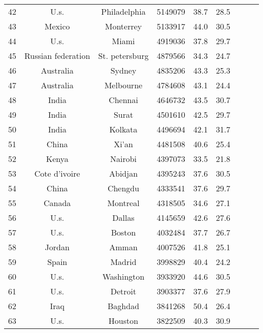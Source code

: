 \begin{table}
\begin{tabular}{ccccccccc}
  42 &                U.s. &    Philadelphia &    5149079 &     38.7 &     28.5 \\
  43 &              Mexico &       Monterrey &    5133917 &     44.0 &     30.5 \\
  44 &                U.s. &           Miami &    4919036 &     37.8 &     29.7 \\
  45 &  Russian federation &  St. petersburg &    4879566 &     34.3 &     24.7 \\
  46 &           Australia &          Sydney &    4835206 &     43.3 &     25.3 \\
  47 &           Australia &       Melbourne &    4784608 &     43.1 &     24.4 \\
  48 &               India &         Chennai &    4646732 &     43.5 &     30.7 \\
  49 &               India &           Surat &    4501610 &     42.5 &     29.7 \\
  50 &               India &         Kolkata &    4496694 &     42.1 &     31.7 \\
  51 &               China &           Xi'an &    4481508 &     40.6 &     25.4 \\
  52 &               Kenya &         Nairobi &    4397073 &     33.5 &     21.8 \\
  53 &       Cote d'ivoire &         Abidjan &    4395243 &     37.6 &     30.5 \\
  54 &               China &         Chengdu &    4333541 &     37.6 &     29.7 \\
  55 &              Canada &        Montreal &    4318505 &     34.6 &     27.1 \\
  56 &                U.s. &          Dallas &    4145659 &     42.6 &     27.6 \\
  57 &                U.s. &          Boston &    4032484 &     37.7 &     26.7 \\
  58 &              Jordan &           Amman &    4007526 &     41.8 &     25.1 \\
  59 &               Spain &          Madrid &    3998829 &     40.4 &     24.2 \\
  60 &                U.s. &      Washington &    3933920 &     44.6 &     30.5 \\
  61 &                U.s. &         Detroit &    3903377 &     37.6 &     27.9 \\
  62 &                Iraq &         Baghdad &    3841268 &     50.4 &     26.4 \\
  63 &                U.s. &         Houston &    3822509 &     40.3 &     30.9 \\

\end{tabular}
\end{table}
